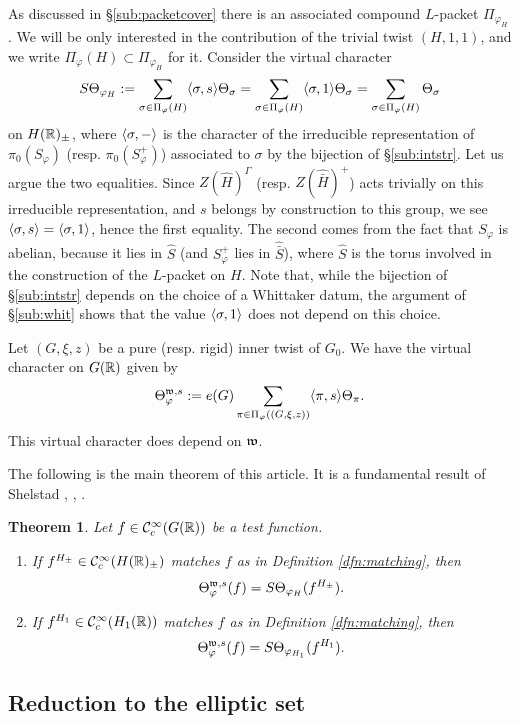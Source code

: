 \documentclass{article}
\newtheorem{thm}{Theorem}[subsection]
\theoremstyle{definition}
\numberwithin{equation}{section}
\renewcommand{\-}{\hyp{}}
\begin{document}
As discussed in \S\ref{sub:packetcover} there is an associated compound $L$-packet $\Pi_{\varphi_H}$. We will be only interested in the contribution of the trivial twist $(H,1,1)$, and we write $\Pi_\varphi(H) \subset \Pi_{\varphi_H}$ for it. Consider the virtual character
\[ S\Theta_{\varphi_H} := \sum_{\sigma \in \Pi_\varphi(H)} \langle\sigma,s\rangle\Theta_\sigma = \sum_{\sigma \in \Pi_\varphi(H)} \langle\sigma,1\rangle\Theta_\sigma = \sum_{\sigma \in \Pi_\varphi(H)} \Theta_\sigma\]
on $H(\mathbb{R})_\pm$, where $\langle\sigma,-\rangle$ is the character of the irreducible representation of $\pi_0(S_\varphi)$ (resp. $\pi_0(S_\varphi^+)$) associated to $\sigma$ by the bijection of \S\ref{sub:intstr}. Let us argue the two equalities. Since $Z(\hat H)^\Gamma$ (resp. $Z(\hat{\bar H})^+$) acts trivially on this irreducible representation, and $s$ belongs by construction to this group, we see $\langle\sigma,s\rangle=\langle\sigma,1\rangle$, hence the first equality. The second comes from the fact that $S_\varphi$ is abelian, because it lies in $\hat S$ (and $S_\varphi^+$ lies in $\hat{\bar S}$), where $\hat S$ is the torus involved in the construction of the $L$-packet on $H$. Note that, while the bijection of \S\ref{sub:intstr} depends on the choice of a Whittaker datum, the argument of \S\ref{sub:whit} shows that the value $\langle\sigma,1\rangle$ does not depend on this choice.

Let $(G,\xi,z)$ be a pure (resp. rigid) inner twist of $G_0$. We have the virtual character on $G(\mathbb{R})$ given by
\[ \Theta_{\varphi}^{\mathfrak{w},s} := e(G)\sum_{\pi \in \Pi_\varphi((G,\xi,z))} \langle\pi,s\rangle\Theta_\pi. \]
This virtual character does depend on $\mathfrak{w}$.

The following is the main theorem of this article. It is a fundamental result of Shelstad \cite{She82}, \cite{SheTE2}, \cite{SheTE3}.
\begin{thm} \label{thm:main1}
Let $f \in \mathcal{C}^\infty_c(G(\mathbb{R}))$ be a test function.
\begin{enumerate}
	\item If $f^{H_\pm} \in \mathcal{C}^\infty_c(H(\mathbb{R})_\pm)$ matches $f$ as in Definition \ref{dfn:matching}, then
	\[ \Theta_\varphi^{\mathfrak{w},s}(f) = S\Theta_{\varphi_H}(f^{H_\pm}). \]
	\item If $f^{H_1} \in \mathcal{C}^\infty_c(H_1(\mathbb{R}))$ matches $f$ as in Definition \ref{dfn:matching}, then
	\[ \Theta_\varphi^{\mathfrak{w},s}(f) = S\Theta_{\varphi_{H_1}}(f^{H_1}). \]
\end{enumerate}
\end{thm}


\subsection{Reduction to the elliptic set}
\end{document}
